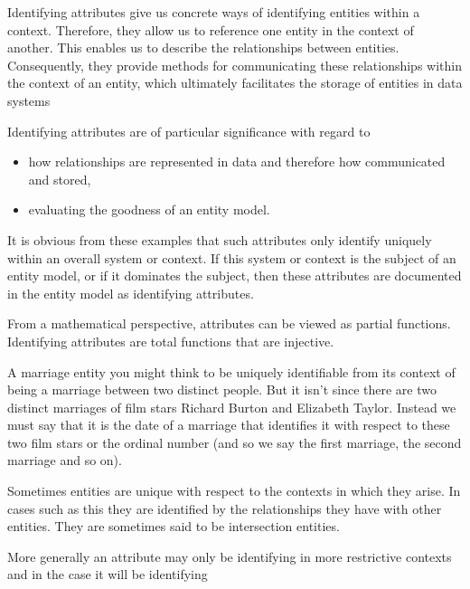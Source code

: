 \mynote
Identifying attributes give us concrete ways of identifying entities within a context. Therefore, they allow us to reference one entity in the context of another. This enables us to describe the relationships between entities. Consequently, they provide methods for communicating these relationships within the context of an entity, which ultimately facilitates the storage of entities in data systems

\mynote Identifying attributes are of particular significance with regard to 
\begin{itemize}
	\item how relationships are represented in data and therefore how communicated and stored,
	\item evaluating the goodness of an entity model.
\end{itemize}  

\mynote
It is obvious from these examples that such attributes only identify uniquely within an overall system or context. If this system or context is the subject of an entity model, or if it dominates the subject, then these attributes are documented in the entity model as identifying attributes. 

\mynote From a mathematical perspective, attributes can be viewed as partial functions. Identifying attributes are total functions that are injective.  

\mynote
A marriage entity you might think to be uniquely identifiable from its context of being a marriage between two distinct people. But it isn't since there are two distinct marriages of film stars Richard Burton and Elizabeth Taylor. Instead we must say that it is the date of a marriage that identifies it with respect to these two film stars or the ordinal number (and so we say the first marriage, the second marriage and so on).

\mynote Sometimes entities are unique with respect to the contexts in which they arise. In cases such as this they are identified by the relationships they have with other entities. They are sometimes said to be intersection entities.




\mynote
More generally an attribute may only be identifying in more restrictive contexts and in the case it will be identifying 


